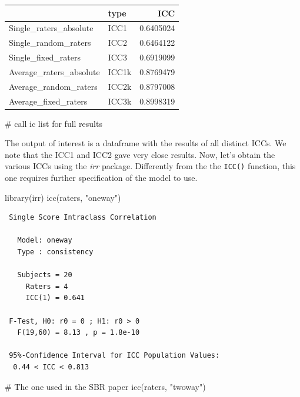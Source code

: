 \documentclass[
  letterpaper,
]{book}
\newenvironment{Shaded}{\begin{snugshade}}{\end{snugshade}}
\newcommand{\CommentTok}[1]{\textcolor[rgb]{0.37,0.37,0.37}{#1}}
\newcommand{\FunctionTok}[1]{\textcolor[rgb]{0.28,0.35,0.67}{#1}}
\newcommand{\NormalTok}[1]{\textcolor[rgb]{0.00,0.23,0.31}{#1}}
\newcommand{\StringTok}[1]{\textcolor[rgb]{0.13,0.47,0.30}{#1}}
\begin{document}
\begin{longtable}[]{@{}llr@{}}
\toprule\noalign{}
& type & ICC \\
\midrule\noalign{}
\endhead
\bottomrule\noalign{}
\endlastfoot
Single\_raters\_absolute & ICC1 & 0.6405024 \\
Single\_random\_raters & ICC2 & 0.6464122 \\
Single\_fixed\_raters & ICC3 & 0.6919099 \\
Average\_raters\_absolute & ICC1k & 0.8769479 \\
Average\_random\_raters & ICC2k & 0.8797008 \\
Average\_fixed\_raters & ICC3k & 0.8998319 \\
\end{longtable}

\begin{Shaded}
\begin{Highlighting}[]
\CommentTok{\# call ic list for full results}
\end{Highlighting}
\end{Shaded}

The output of interest is a dataframe with the results of all distinct
ICCs. We note that the ICC1 and ICC2 gave very close results. Now, let's
obtain the various ICCs using the \emph{irr} package. Differently from
the the \texttt{ICC()} function, this one requires further specification
of the model to use.

\begin{Shaded}
\begin{Highlighting}[]
\FunctionTok{library}\NormalTok{(irr)}
\FunctionTok{icc}\NormalTok{(raters, }\StringTok{"oneway"}\NormalTok{)}
\end{Highlighting}
\end{Shaded}

\begin{verbatim}
 Single Score Intraclass Correlation

   Model: oneway 
   Type : consistency 

   Subjects = 20 
     Raters = 4 
     ICC(1) = 0.641

 F-Test, H0: r0 = 0 ; H1: r0 > 0 
   F(19,60) = 8.13 , p = 1.8e-10 

 95%-Confidence Interval for ICC Population Values:
  0.44 < ICC < 0.813
\end{verbatim}

\begin{Shaded}
\begin{Highlighting}[]
\CommentTok{\# The one used in the SBR paper}
\FunctionTok{icc}\NormalTok{(raters, }\StringTok{"twoway"}\NormalTok{)}
\end{Highlighting}
\end{Shaded}
\end{document}
